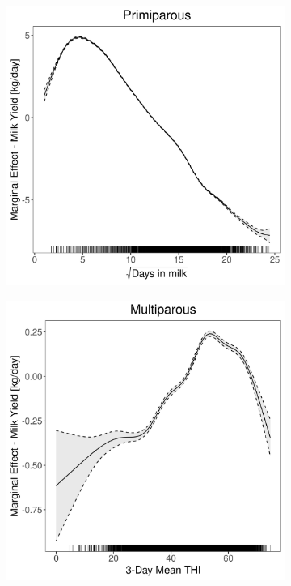 \begin{figure}[H]
\begin{subfigure}[b]{0.45\textwidth}
    \end{subfigure}
    \hspace{0.05\textwidth} %
    \begin{subfigure}[b]{0.45\textwidth}
        \centering
        \includegraphics[width=\textwidth]{thesis/figures/models/milk/before2010/bs_milk_before2010/bs_milk_before2010_marginal_dim_milk_primi.png}
    \end{subfigure}
    \begin{subfigure}[b]{0.45\textwidth}
        \centering
        \includegraphics[width=\textwidth]{thesis/figures/models/milk/before2010/bs_milk_before2010/bs_milk_before2010_marginal_thi_milk_multi.png}

\end{subfigure}
\end{figure}

